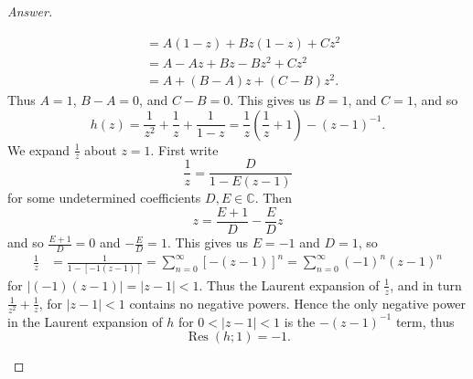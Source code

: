 \documentclass[12pt]{article}
\newcommand{\cx}{\mathbb{C}}
\newcommand\paren[1]{\left( #1 \right)}
\newcommand{\sqbrack}[1]{\left [ #1 \right ]}
\theoremstyle{definition}
\DeclareMathOperator\Res{Res}
\begin{document}
\begin{proof}[Answer]
\begin{enumerate}[i)]
\begin{align*}
            & = A(1-z) + Bz(1-z) + Cz^2 \\
            & = A - Az + Bz - Bz^2 + Cz^2 \\
            & = A + (B-A)z + (C-B)z^2.
        \end{align*}
        Thus $A = 1$, $B - A = 0$, and $C - B = 0$. This gives us $B = 1$, and $C = 1$, and so 
        \[
            h(z) = \frac{1}{z^2} + \frac{1}{z} + \frac{1}{1-z} = \frac{1}{z} \paren{ \frac{1}{z} + 1 } - (z-1)^{-1}.
        \]
        We expand $\frac{1}{z}$ about $z = 1$. First write 
        \[
            \frac{1}{z} = \frac{D}{1-E(z-1)}
        \]
        for some undetermined coefficients $D , E \in \cx$. Then 
        \[
            z = \frac{E+1}{D} - \frac{E}{D}z
        \]
        and so $\frac{E+1}{D} = 0$ and $-\frac{E}{D} = 1$. This gives us $E = -1$ and $D = 1$, so 
        \begin{align*}
            \frac{1}{z} & = \frac{1}{1 - \sqbrack{-1 (z-1)} } = \sum\limits_{n = 0}^{\infty} \sqbrack{ -(z-1) }^n = \sum\limits_{n = 0}^{\infty} (-1)^n (z-1)^n
        \end{align*}
        for $|(-1)(z-1)| = |z-1| < 1$. Thus the Laurent expansion of $\frac{1}{z}$, and in turn $\frac{1}{z^2} + \frac{1}{z}$, for $|z-1| < 1$ contains no negative powers. Hence the only negative power in the Laurent expansion of $h$ for $0<|z-1|<1$ is the $-(z-1)^{-1}$ term, thus
        \[
            \Res(h;1) = \boxed{ -1. }
        \]
    \end{enumerate}
\end{proof}
\end{document}
